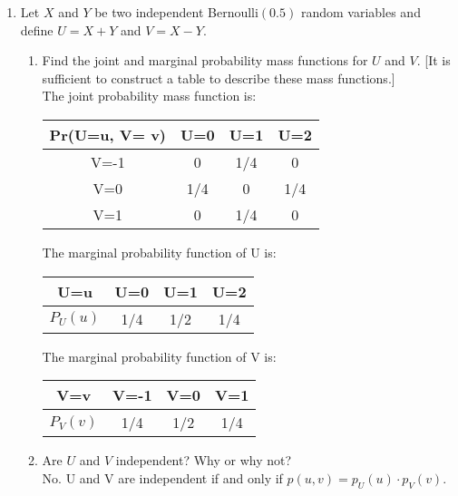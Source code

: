 \documentclass[11pt]{article}
\begin{document}
\begin{enumerate}[label=\textbf{Question \arabic*:},start=1]
\begin{enumerate}
\end{enumerate}





\item Let $X$ and $Y$ be two independent Bernoulli$(0.5)$ random variables and define $U = X + Y$ and $V = X - Y$. 
\begin{enumerate}
	\item Find the joint and marginal probability mass functions for $U$ and $V$. [It is sufficient to construct a table to describe these mass functions.]\\
	
	The joint probability mass function is:
\begin{center}
 \begin{tabular}{|| c c c c ||} 
 \hline
 Pr(U=u, V= v) & U=0 & U=1 & U=2 \\ [0.5ex] 
 \hline\hline
 V=-1 & 0 & 1/4 & 0  \\ 
 \hline
 V=0 & 1/4 & 0 & 1/4  \\
 \hline
 V=1 & 0 & 1/4 & 0 \\
 \hline
\end{tabular}
\end{center}

	The marginal probability function of U is:
\begin{center}
 \begin{tabular}{|| c c c c ||} 
 \hline
 U=u & U=0 & U=1 & U=2 \\ [0.5ex] 
 \hline\hline
 $P_{U}(u)$ & 1/4 & 1/2 & 1/4  \\ 
 \hline
\end{tabular}
\end{center}

	The marginal probability function of V is:
\begin{center}
 \begin{tabular}{|| c c c c ||} 
 \hline
 V=v & V=-1 & V=0 & V=1 \\ [0.5ex] 
 \hline\hline
 $P_{V}(v)$ & 1/4 & 1/2 & 1/4  \\ 
 \hline
\end{tabular}
\end{center}

	\item Are $U$ and $V$ independent? Why or why not?\\
	
	No. U and V are independent if and only if $p(u,v) = p_U(u) \cdot p_V(v)$. \\
	

\end{enumerate}
\end{enumerate}
\end{document}
